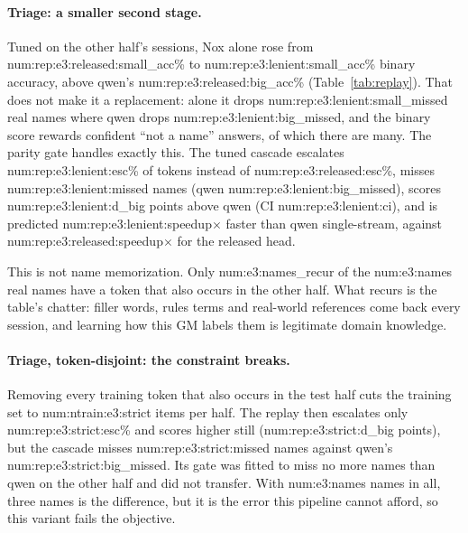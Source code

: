\documentclass[11pt]{article}
\newcommand{\N}[1]{\csname num:#1\endcsname}
\begin{document}
\begin{table}[t]
\centering
\small
\setlength{\tabcolsep}{4pt}
\resizebox{\textwidth}{!}{}
\caption{Replay of the Nox $\rightarrow$ qwen cascade with the released and the tuned head, held out
as in the text (head and gate cross-fitted). qwen alone scores \N{rep:e3:released:big_acc}\% on E3
and \N{rep:e4facts:released:big_acc}\% on E4. ``Missed'' is real names dropped by the cascade / by
qwen alone. Speed-up is against qwen alone, single-stream, from service times measured live in the
cascade study. ``Disjoint'' also removes from training every item sharing an entity (E4) or token
(E3) with the test half. The lookup row files each fact under the type the GM gave its entity in the
other half, falling back to released Nox when the entity is new.}
\label{tab:replay}
\end{table}

\paragraph{Triage: a smaller second stage.} Tuned on the other half's sessions, Nox alone rose from
\N{rep:e3:released:small_acc}\% to \N{rep:e3:lenient:small_acc}\% binary accuracy, above qwen's
\N{rep:e3:released:big_acc}\% (Table~\ref{tab:replay}). That does not make it a replacement: alone it
drops \N{rep:e3:lenient:small_missed} real names where qwen drops \N{rep:e3:lenient:big_missed}, and
the binary score rewards confident ``not a name'' answers, of which there are many. The parity gate
handles exactly this. The tuned cascade escalates \N{rep:e3:lenient:esc}\% of tokens instead of
\N{rep:e3:released:esc}\%, misses \N{rep:e3:lenient:missed} names (qwen
\N{rep:e3:lenient:big_missed}), scores \N{rep:e3:lenient:d_big} points above qwen (CI
\N{rep:e3:lenient:ci}), and is predicted \N{rep:e3:lenient:speedup}$\times$ faster than qwen
single-stream, against \N{rep:e3:released:speedup}$\times$ for the released head.

This is not name memorization. Only \N{e3:names_recur} of the \N{e3:names} real names have a token
that also occurs in the other half. What recurs is the table's chatter: filler words, rules terms
and real-world references come back every session, and learning how this GM labels them is
legitimate domain knowledge.

\paragraph{Triage, token-disjoint: the constraint breaks.} Removing every training token that also
occurs in the test half cuts the training set to \N{ntrain:e3:strict} items per half. The replay
then escalates only \N{rep:e3:strict:esc}\% and scores higher still
(\N{rep:e3:strict:d_big} points), but the cascade misses \N{rep:e3:strict:missed} names against
qwen's \N{rep:e3:strict:big_missed}. Its gate was fitted to miss no more names than qwen on the
other half and did not transfer. With \N{e3:names} names in all, three names is the difference, but
it is the error this pipeline cannot afford, so this variant fails the objective.
\end{document}
